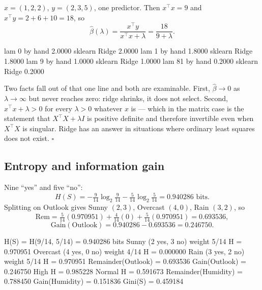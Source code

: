 \documentclass[11pt]{article}
\begin{document}
\begin{worked}
$x = (1,2,2)$, $y = (2,3,5)$, one predictor. Then $x^\top x = 9$ and
$x^\top y = 2 + 6 + 10 = 18$, so
\[
  \hat\beta(\lambda) = \frac{x^\top y}{x^\top x + \lambda}
                     = \frac{18}{9 + \lambda}.
\]
\end{worked}

\begin{codeout}
lam   0   by hand 2.0000   sklearn Ridge 2.0000
lam   1   by hand 1.8000   sklearn Ridge 1.8000
lam   9   by hand 1.0000   sklearn Ridge 1.0000
lam  81   by hand 0.2000   sklearn Ridge 0.2000
\end{codeout}

Two facts fall out of that one line and both are examinable. First,
$\hat\beta \to 0$ as $\lambda \to \infty$ but never reaches zero: ridge
shrinks, it does not select. Second, $x^\top x + \lambda > 0$ for every
$\lambda > 0$ whatever $x$ is --- which in the matrix case is the statement
that $X^\top X + \lambda I$ is positive definite and therefore invertible even
when $X^\top X$ is singular. Ridge has an answer in situations where ordinary
least squares does not exist. \ensuremath{\square}

\subsection{Entropy and information gain}

\begin{worked}
Nine ``yes'' and five ``no'':
\[
  H(S) = -\tfrac{9}{14}\log_2\tfrac{9}{14} - \tfrac{5}{14}\log_2\tfrac{5}{14}
       = 0.940286 \text{ bits}.
\]
Splitting on Outlook gives Sunny $(2,3)$, Overcast $(4,0)$, Rain $(3,2)$, so
\[
  \mathrm{Rem} = \tfrac{5}{14}(0.970951) + \tfrac{4}{14}(0) +
                 \tfrac{5}{14}(0.970951) = 0.693536,
\]
\[
  \mathrm{Gain(Outlook)} = 0.940286 - 0.693536 = 0.246750 .
\]
\end{worked}

\begin{codeout}
H(S) = H(9/14, 5/14) = 0.940286 bits
Sunny     (2 yes, 3 no)  weight 5/14  H = 0.970951
Overcast  (4 yes, 0 no)  weight 4/14  H = 0.000000
Rain      (3 yes, 2 no)  weight 5/14  H = 0.970951
Remainder(Outlook) = 0.693536   Gain(Outlook) = 0.246750
High H = 0.985228   Normal H = 0.591673
Remainder(Humidity) = 0.788450  Gain(Humidity) = 0.151836
Gini(S) = 0.459184
\end{codeout}
\end{document}
